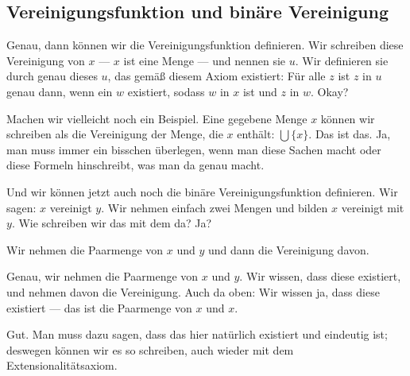 \subsection{Vereinigungsfunktion und binäre Vereinigung}
\begin{spoken-clean}[00:15:06 - 00:17:17]
Genau, dann können wir die Vereinigungsfunktion definieren. Wir schreiben diese Vereinigung von $x$ --- $x$ ist eine Menge --- und nennen sie $u$. Wir definieren sie durch genau dieses $u$, das gemäß diesem Axiom existiert: Für alle $z$ ist $z$ in $u$ genau dann, wenn ein $w$ existiert, sodass $w$ in $x$ ist und $z$ in $w$. Okay?

Machen wir vielleicht noch ein Beispiel. Eine gegebene Menge $x$ können wir schreiben als die Vereinigung der Menge, die $x$ enthält: $\bigcup \{x\}$. Das ist das. Ja, man muss immer ein bisschen überlegen, wenn man diese Sachen macht oder diese Formeln hinschreibt, was man da genau macht.

Und wir können jetzt auch noch die binäre Vereinigungsfunktion definieren. Wir sagen: $x$ vereinigt $y$. Wir nehmen einfach zwei Mengen und bilden $x$ vereinigt mit $y$. Wie schreiben wir das mit dem da? Ja?
\end{spoken-clean}

\begin{student-interaction}[Studentenantwort]
Wir nehmen die Paarmenge von $x$ und $y$ und dann die Vereinigung davon.
\end{student-interaction}

\begin{spoken-clean}[continued]
Genau, wir nehmen die Paarmenge von $x$ und $y$. Wir wissen, dass diese existiert, und nehmen davon die Vereinigung. Auch da oben: Wir wissen ja, dass diese existiert --- das ist die Paarmenge von $x$ und $x$.

Gut. Man muss dazu sagen, dass das hier natürlich existiert und eindeutig ist; deswegen können wir es so schreiben, auch wieder mit dem Extensionalitätsaxiom.
\end{spoken-clean}

